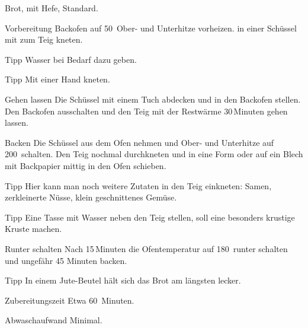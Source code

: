 \begin{recipe}{Brot, mit Hefe, Standard.}
	\item[Vorbereitung] Backofen auf 50\textcelsius~Ober- und Unterhitze vorheizen.
	 in einer Schüssel mit
	 zum Teig kneten. 
	\item[Tipp] Wasser bei Bedarf dazu geben. 
	\item[Tipp] Mit einer Hand kneten.
	\item[Gehen lassen] Die Schüssel mit einem Tuch abdecken und in den Backofen stellen. Den Backofen ausschalten und den Teig mit der Restwärme 30\,Minuten gehen lassen.
	\item[Backen] Die Schüssel aus dem Ofen nehmen und Ober- und Unterhitze auf 200\textcelsius~schalten. Den Teig nochmal durchkneten und in eine Form oder auf ein Blech mit Backpapier mittig in den Ofen schieben. 
	\item[Tipp] Hier kann man noch weitere Zutaten in den Teig einkneten: Samen, zerkleinerte Nüsse, klein geschnittenes Gemüse.
	\item[Tipp] Eine Tasse mit Wasser neben den Teig stellen, soll eine besonders krustige Kruste machen.
	\item[Runter schalten] Nach 15\,Minuten die Ofentemperatur auf 180\textcelsius~runter schalten und ungefähr 45 Minuten backen.
	\item[Tipp] In einem Jute-Beutel hält sich das Brot am längsten lecker.
	\item[Zubereitungszeit] Etwa 60~Minuten.
	\item[Abwaschaufwand] Minimal.
\end{recipe}